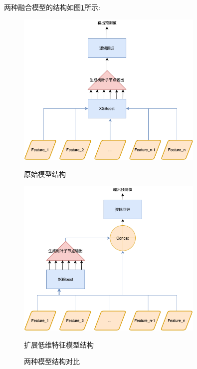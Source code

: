 两种融合模型的结构如图\ref{Model-integration-visualization}所示:
\begin{figure}[htb]
  \vspace{13pt} %
  \begin{minipage}[htb]{0.5\linewidth}
      \centering
      \includegraphics[width=0.8\textwidth]{images/Model-integration-noextend-feature.png}
      \caption{原始模型结构}
  \end{minipage}
  \begin{minipage}[htb]{0.5\linewidth}
      \centering
      \includegraphics[width=0.8\textwidth]{images/Model-integration-extend-feature-2.png}
      \caption{扩展低维特征模型结构}
  \end{minipage}
  \caption{两种模型结构对比}\label{Model-integration-visualization} %
\end{figure}

